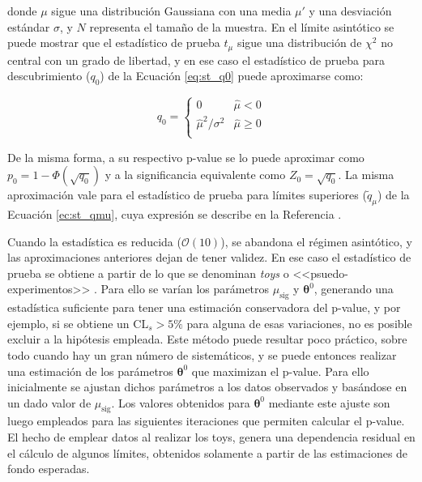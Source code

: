 \noindent
donde $\mu$ sigue una distribución Gaussiana con una media $\mu'$ y una desviación estándar $\sigma$, y $N$ representa el tamaño de la muestra. 
En el límite asintótico se puede mostrar que el estadístico de prueba $t_{\mu}$ sigue una distribución de $\chi^{2}$ no central con un grado de libertad, y en ese caso el estadístico de prueba para descubrimiento ($q_{0}$) de la Ecuación \ref{eq:st_q0} puede aproximarse como:

\begin{equation}
	q_{0}=
	\begin{cases}
		0 & \hat{\mu}<0 \\
		\hat{\mu}^{2}/\sigma^{2} & \hat{\mu}\ge 0 \\
	\end{cases}
\end{equation}

De la misma forma, a su respectivo p-value se lo puede aproximar como $p_{0}=1-\Phi(\sqrt{q_{0}})$ y a la significancia equivalente como $Z_{0}=\sqrt{q_{0}}$. La misma aproximación vale para el estadístico de prueba para límites superiores ($\tilde{q}_{\mu}$) de la Ecuación \ref{ec:st_qmu}, cuya expresión se describe en la Referencia \cite{Cowan:2010js}.

Cuando la estadística es reducida ($\mathcal{O}(10)$), se abandona el régimen asintótico, y las aproximaciones anteriores dejan de tener validez. En ese caso el estadístico de prueba se obtiene a partir de lo que se denominan \textit{toys} o <<psuedo-experimentos>> \cite{Baak:2014wma}. Para ello se varían los parámetros $\mu_\text{sig}$ y $\bm{\theta}^0$, generando una estadística suficiente para tener una estimación conservadora del p-value, y por ejemplo, si se obtiene un $\text{CL}_{s}>5\%$ para alguna de esas variaciones, no es posible excluir a la hipótesis empleada. Este método puede resultar poco práctico, sobre todo cuando hay un gran número de sistemáticos, y se puede entonces realizar una estimación de los parámetros $\bm{\theta}^0$ que maximizan el p-value. Para ello inicialmente se ajustan dichos parámetros a los datos observados y basándose en un dado valor de $\mu_\text{sig}$. Los valores obtenidos para $\bm{\theta}^0$ mediante este ajuste son luego empleados para las siguientes iteraciones que permiten calcular el p-value. El hecho de emplear datos al realizar los toys, genera una dependencia residual en el cálculo de algunos límites, obtenidos solamente a partir de las estimaciones de fondo esperadas.
 



